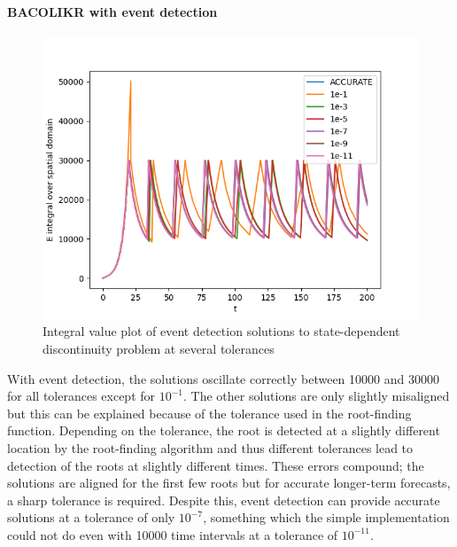 \documentclass{article}
\begin{document}
\paragraph{BACOLIKR with event detection}
\begin{figure}[H]
\centering
\includegraphics[width=0.7\linewidth]{./figures/pde_state_disc_tol_event}
\caption{Integral value plot of event detection solutions to state-dependent discontinuity problem at several tolerances}
\label{fig:pde_state_disc_tol_event}
\end{figure}

With event detection, the solutions oscillate correctly between 10000 and 30000 for all tolerances except for $10^{-1}$. The other solutions are only slightly misaligned but this can be explained because of the tolerance used in the root-finding function. Depending on the tolerance, the root is detected at a slightly different location by the root-finding algorithm and thus different tolerances lead to detection of the roots at slightly different times. These errors compound; the solutions are aligned for the first few roots but for accurate longer-term forecasts, a sharp tolerance is required. Despite this, event detection can provide accurate solutions at a tolerance of only $10^{-7}$, something which the simple implementation could not do even with 10000 time intervals at a tolerance of $10^{-11}$.
\end{document}
